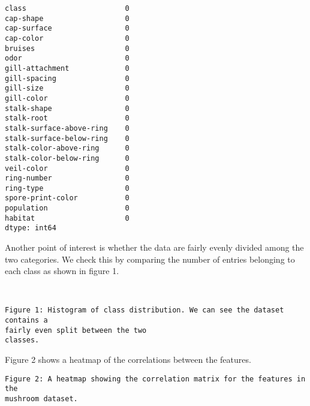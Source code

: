 \documentclass[11pt]{article}
\makeatletter
\newcommand{\boxspacing}{\kern\kvtcb@left@rule\kern\kvtcb@boxsep}
\newcommand{\prompt}[4]{
        {\ttfamily\llap{{\color{#2}[#3]:\hspace{3pt}#4}}\vspace{-\baselineskip}}
    }
\makeatother
\begin{document}
            \begin{tcolorbox}[breakable, size=fbox, boxrule=.5pt, pad at break*=1mm, opacityfill=0]
\prompt{Out}{outcolor}{90}{\boxspacing}
\begin{Verbatim}[commandchars=\\\{\}]
class                       0
cap-shape                   0
cap-surface                 0
cap-color                   0
bruises                     0
odor                        0
gill-attachment             0
gill-spacing                0
gill-size                   0
gill-color                  0
stalk-shape                 0
stalk-root                  0
stalk-surface-above-ring    0
stalk-surface-below-ring    0
stalk-color-above-ring      0
stalk-color-below-ring      0
veil-color                  0
ring-number                 0
ring-type                   0
spore-print-color           0
population                  0
habitat                     0
dtype: int64
\end{Verbatim}
\end{tcolorbox}
        
    Another point of interest is whether the data are fairly evenly divided
among the two categories. We check this by comparing the number of
entries belonging to each class as shown in figure 1.


    \begin{center}
    \end{center}
    { \hspace*{\fill} \\}
    
    \begin{Verbatim}[commandchars=\\\{\}]
Figure 1: Histogram of class distribution. We can see the dataset contains a
fairly even split between the two
classes.
    \end{Verbatim}

    Figure 2 shows a heatmap of the correlations between the features.


    \begin{Verbatim}[commandchars=\\\{\}]
Figure 2: A heatmap showing the correlation matrix for the features in the
mushroom dataset.
    \end{Verbatim}

    \begin{center}
    \end{center}
    { \hspace*{\fill} \\}
    
\end{document}
